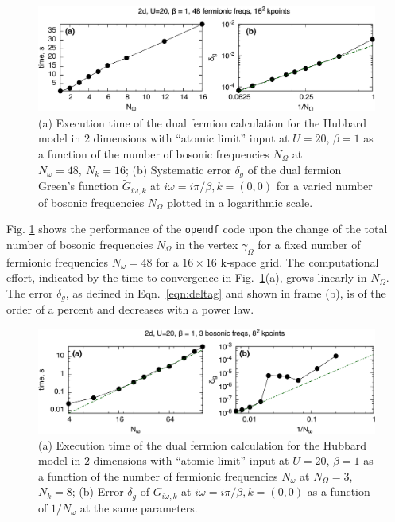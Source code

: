 \documentclass[3p,times,procedia]{elsarticle}
\begin{document}
\begin{figure}[ht]
\includegraphics[width=1.0\columnwidth]{time_bfreqs.pdf}
\caption{(a) Execution time of the dual fermion calculation for the Hubbard model in $2$ dimensions with ``atomic limit'' input at $U=20$, $\beta = 1$ as a function of the number of bosonic frequencies $N_{\Omega}$ at $N_{\omega} = 48,~N_k = 16$; (b) Systematic error $\delta_g$ of the dual fermion Green's function $\tilde G_{i\omega, k}$ at $i\omega = i\pi / \beta, k = (0,0)$ for a varied number of bosonic frequencies $N_\Omega$ plotted in a logarithmic scale. }
\label{fig:benchmark_b}
\end{figure}

Fig. \ref{fig:benchmark_b} shows the performance of the \texttt{opendf} code upon the change of the total number of bosonic frequencies $N_{\Omega}$ in the vertex $\gamma_{\Omega}$ for a fixed number of fermionic frequencies $N_{\omega}=48$ for a $16 \times 16$ k-space grid. The computational effort, indicated by the time to convergence in Fig.~\ref{fig:benchmark_b}(a), grows linearly in $N_{\Omega}$. The error $\delta_g$, as defined in Eqn.~\ref{eqn:deltag} and shown in frame (b), is of the order of a percent and decreases with a power law.

\begin{figure}[ht]
\includegraphics[width=1.0\columnwidth]{time_ffreqs.pdf}
\caption{(a) Execution time of the dual fermion calculation for the Hubbard model in $2$ dimensions with ``atomic limit'' input at $U=20$, $\beta = 1$ as a function of the number of fermionic frequencies $N_{\omega}$ at $N_{\Omega} = 3$, $N_k = 8$; (b) Error $\delta_g$ of $G_{i\omega, k}$ at $i\omega = i\pi / \beta, k = (0,0)$ as a function of $1/N_{\omega}$ at the same parameters.}
\label{fig:benchmark_f}
\end{figure}
\end{document}
